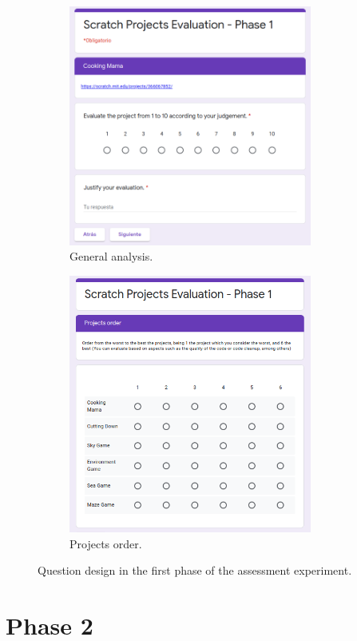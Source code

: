 \begin{figure}
    \begin{subfigure}{.5\textwidth}
    \centering
    \includegraphics[width=8cm]{img/experiment_question_1.png}
    \caption{General analysis.}
    \label{subfig:questions_general_1}
  \end{subfigure}
  \begin{subfigure}{.5\textwidth}
    \centering
    \includegraphics[width=8cm]{img/projects_order_1.png}
    \caption{Projects order.}
    \label{subfig:questions_order_1}
  \end{subfigure}
    \caption{Question design in the first phase of the assessment experiment.}
    \label{fig:question_design_1}
\end{figure}


\section{Phase 2}
\label{app:phase_2}

